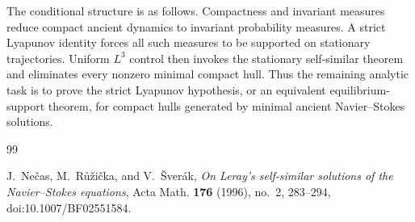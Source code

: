 \documentclass[11pt]{amsart}
\theoremstyle{plain}
\theoremstyle{definition}
\theoremstyle{remark}
\numberwithin{equation}{section}
\begin{document}
The conditional structure is as follows.  Compactness and invariant measures
reduce compact ancient dynamics to invariant probability measures.  A strict
Lyapunov identity forces all such measures to be supported on stationary
trajectories.  Uniform \(L^3\) control then invokes the stationary
self-similar theorem and eliminates every nonzero minimal compact hull.  Thus
the remaining analytic task is to prove the strict Lyapunov hypothesis, or an
equivalent equilibrium-support theorem, for compact hulls generated by minimal
ancient Navier--Stokes solutions.

\begin{thebibliography}{99}

J.~Ne\v{c}as, M.~R\r{u}\v{z}i\v{c}ka, and V.~\v{S}ver\'ak,
\emph{On Leray's self-similar solutions of the Navier--Stokes equations},
Acta Math. \textbf{176} (1996), no.~2, 283--294,
doi:10.1007/BF02551584.

\end{thebibliography}
\end{document}
